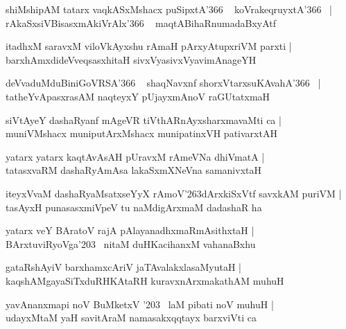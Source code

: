 \documentclass[twoside,12pt,openright]{book}
\def\S{\char'263}
\newcounter{shloka}[chapter]
\begin{document}
\begin{shloka}%
shiMshipAM tatarx vaqkASxMshacx puSipxtA\char'366 ~ koVrakeqruyxtA\char'366 ~|\\
rAkaSxsiVBisasxmAkiVrAlx\char'366 ~ maqtABihaRnumadaBxyAtf
\end{shloka}

\begin{shloka}%
itadhxM saravxM viloVkAyxshu rAmaH pArxyAtupxriVM parxti |\\
barxhAmxdideVveqsasxhitaH sivxVyasivxVyavimAnageYH
\end{shloka}

\begin{shloka}%
deVvaduMduBiniGoVRSA\char'366 ~ shaqNavxnf shorxVtarxsuKAvahA\char'366 ~|\\
tatheYvApasxrasAM naqteyxY pUjayxmAnoV raGUtatxmaH
\end{shloka}

\begin{shloka}%
siVtAyeY dashaRyanf mAgeVR tiVthARnAyxsharxmavaMti ca |\\
muniVMshacx muniputArxMshacx munipatinxVH pativarxtAH
\end{shloka}

\begin{shloka}%
yatarx yatarx kaqtAvAsAH pUravxM rAmeVNa dhiVmatA |\\
tatasxvaRM dashaRyAmAsa lakaSxmXNeVna samanivxtaH
\end{shloka}

\begin{shloka}%
iteyxVvaM dashaRyaMsatxseYyX rAmoV\S dArxkiSxVtf savxkAM puriVM |\\
tasAyxH punasasxmiVpeV tu naMdigArxmaM dadashaR ha 
\end{shloka}

\begin{shloka}%
yatarx veY BAratoV rajA pAlayanadhxmaRmAsithxtaH |\\
BArxtuviRyoVga\char'203 ~nitaM duHKacihanxM vahanaBxhu
\end{shloka}

\begin{shloka}%
gataRshAyiV barxhamxcAriV jaTAvalakxlasaMyutaH |\\
kaqshAMgayaSiTxduRHKAtaRH kuravxnArxmakathAM muhuH
\end{shloka}

\begin{shloka}%
yavAnanxmapi noV BuMketxV  \char'203 ~laM pibati noV muhuH |\\
udayxMtaM yaH savitAraM namasakxqqtayx barxviVti ca
\end{shloka}
\end{document}
